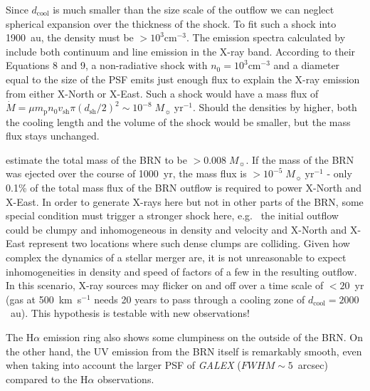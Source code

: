 \documentclass[linenumbers]{aastex631}
\begin{document}
Since $d_{\mathrm{cool}}$ is much smaller than the size scale of the outflow we can neglect spherical expansion over the thickness of the shock.
To fit such a shock into 1900~au, the density must be $>10^3\mathrm{ cm}^{-3}$. The emission spectra calculated by \citet{2002ApJ...576L.149R} include both continuum and line emission in the X-ray band. According to their Equations 8 and 9, a non-radiative shock with $n_0=10^3\mathrm{ cm}^{-3}$ and a diameter equal to the size of the PSF emits just enough flux to explain the X-ray emission from either X-North or X-East. Such a shock would have a mass flux of $\dot M = \mu m_\mathrm{p} n_0 v_\mathrm{sh} \pi (d_\mathrm{sh}/2)^2 \sim 10^{-8}\;M_\sun\;\mathrm{yr}^{-1}$.
Should the densities by higher, both the cooling length and the volume of the shock would be smaller, but the mass flux stays unchanged.

\citet{2020Natur.587..387H} estimate the total mass of the BRN to be $>0.008\;M_\sun{}$. If the mass of the BRN was ejected over the course of 1000~yr, the mass flux is $>10^{-5}\;M_\sun\;\mathrm{yr}^{-1}$ - only 0.1\% of the total mass flux of the BRN outflow is required to power X-North and X-East. In order to generate X-rays here but not in other parts of the BRN, some special condition must trigger a stronger shock here, e.g.\
the initial outflow could be clumpy and inhomogeneous in density and velocity and X-North and X-East represent two locations where such dense clumps are colliding. Given how complex the dynamics of a stellar merger are, it is not unreasonable to expect inhomogeneities in density and speed of factors of a few in the resulting outflow. In this scenario, X-ray sources may flicker on and off over a time scale of $<20$~yr (gas at 500~km~s$^{-1}$ needs 20 years to pass through a cooling zone of $d_{\mathrm{cool}}=2000$~au). This hypothesis is testable with new observations!

The H$\alpha$ emission ring also shows some clumpiness on the outside of the BRN. On the other hand, the UV emission from the BRN itself is remarkably smooth, even when taking into account the larger PSF of \emph{GALEX} ($FWHM \sim 5$~arcsec) compared to the H$\alpha$ observations.
\end{document}
